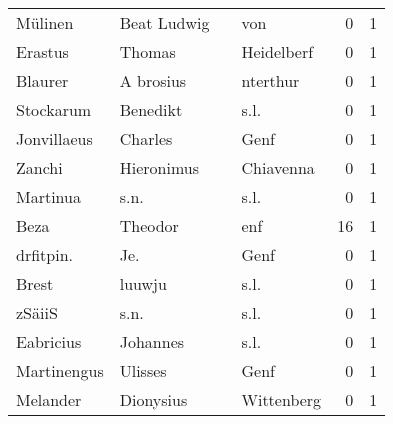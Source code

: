 \begin{center}
\begin{tiny}
\begin{longtabu}{llllrr}
                  Mülinen &                        Beat Ludwig &             &                                         von &          0 &         1 \\
                  Erastus &                             Thomas &             &                                  Heidelberf &          0 &         1 \\
                  Blaurer &                          A brosius &             &                                    nterthur &          0 &         1 \\
                Stockarum &                           Benedikt &             &                                        s.l. &          0 &         1 \\
              Jonvillaeus &                            Charles &             &                                        Genf &          0 &         1 \\
                   Zanchi &                         Hieronimus &             &                                   Chiavenna &          0 &         1 \\
                 Martinua &                               s.n. &             &                                        s.l. &          0 &         1 \\
                     Beza &                            Theodor &             &                                         enf &         16 &         1 \\
                drfitpin. &                                Je. &             &                                        Genf &          0 &         1 \\
                    Brest &                             luuwju &             &                                        s.l. &          0 &         1 \\
                   zSäiiS &                               s.n. &             &                                        s.l. &          0 &         1 \\
                Eabricius &                           Johannes &             &                                        s.l. &          0 &         1 \\
              Martinengus &                            Ulisses &             &                                        Genf &          0 &         1 \\
                 Melander &                          Dionysius &             &                                  Wittenberg &          0 &         1 \\

\end{longtabu}
\end{tiny}
\end{center}
